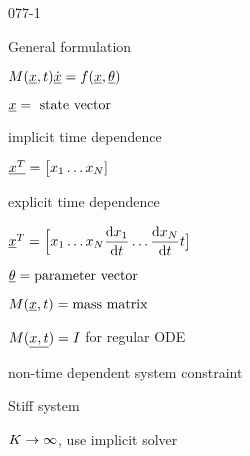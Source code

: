 \begin{mitframe}{077-1}
\begin{listone}
	\item General formulation
    \begin{listtwo}
    	\item $M(\uline{\disp},\timet)\uline{\dot{\disp}}=\fug(\uline{\disp},\uline{\theta})$
        \begin{listthree}
        	\item $\uline{\disp}=\textnormal{ state vector}$
            	\begin{listfour}
                	\item implicit time dependence
                    	\begin{listfive}
                          \item $\uline{{\disp}^{\Temp}}=\big[\disp_1\ldots\disp_{\nummoles}]$
                          \end{listfive}
                	\item explicit time dependence
                    	\begin{listfive}
                        	\item $\uline{\disp}^{\Temp}=\Big[\disp_1\ldots\disp_{\nummoles}\dfrac{\mathrm{d}\disp_1}{\mathrm{d}\timet}\ldots\dfrac{\mathrm{d}\disp_{\nummoles}}{\mathrm{d}\timet}\timet\big]$
                        \end{listfive}
                \end{listfour}
        	\item $\uline{\theta}=\textnormal{parameter vector}$
            \item $M(\uline{\disp},\timet)=\textnormal{mass matrix}$
            	\begin{listfour}
                	\item $M(\uline{\disp,\timet})=\mominertia$ for regular ODE
                    \item non-time dependent system constraint
                \end{listfour}
        \end{listthree}
    	\item Stiff system
        	\begin{listthree}
            	\item $\dilfac\rightarrow\infty$, use implicit solver
            \end{listthree}
    \end{listtwo}
\end{listone}    
\end{mitframe}